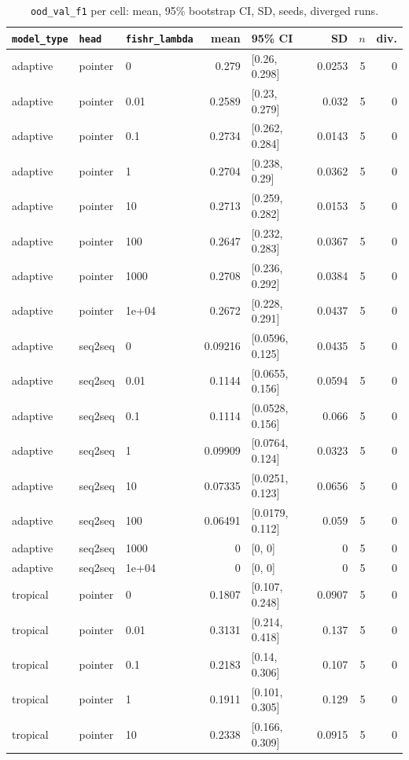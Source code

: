\documentclass[10pt]{article}
\begin{document}
{\small
\begin{longtable}{lllrlrrr}
\caption{\texttt{ood\_val\_f1} per cell: mean, 95\% bootstrap CI, SD, seeds, diverged runs.}\label{tab:summary-ood_val_f1}\\
\toprule
\texttt{model\_type} & \texttt{head} & \texttt{fishr\_lambda} & mean & 95\% CI & SD & $n$ & div.\\
\midrule
\endhead
adaptive & pointer & 0 & 0.279 & [0.26, 0.298] & 0.0253 & 5 & 0\\
adaptive & pointer & 0.01 & 0.2589 & [0.23, 0.279] & 0.032 & 5 & 0\\
adaptive & pointer & 0.1 & 0.2734 & [0.262, 0.284] & 0.0143 & 5 & 0\\
adaptive & pointer & 1 & 0.2704 & [0.238, 0.29] & 0.0362 & 5 & 0\\
adaptive & pointer & 10 & 0.2713 & [0.259, 0.282] & 0.0153 & 5 & 0\\
adaptive & pointer & 100 & 0.2647 & [0.232, 0.283] & 0.0367 & 5 & 0\\
adaptive & pointer & 1000 & 0.2708 & [0.236, 0.292] & 0.0384 & 5 & 0\\
adaptive & pointer & 1e+04 & 0.2672 & [0.228, 0.291] & 0.0437 & 5 & 0\\
adaptive & seq2seq & 0 & 0.09216 & [0.0596, 0.125] & 0.0435 & 5 & 0\\
adaptive & seq2seq & 0.01 & 0.1144 & [0.0655, 0.156] & 0.0594 & 5 & 0\\
adaptive & seq2seq & 0.1 & 0.1114 & [0.0528, 0.156] & 0.066 & 5 & 0\\
adaptive & seq2seq & 1 & 0.09909 & [0.0764, 0.124] & 0.0323 & 5 & 0\\
adaptive & seq2seq & 10 & 0.07335 & [0.0251, 0.123] & 0.0656 & 5 & 0\\
adaptive & seq2seq & 100 & 0.06491 & [0.0179, 0.112] & 0.059 & 5 & 0\\
adaptive & seq2seq & 1000 & 0 & [0, 0] & 0 & 5 & 0\\
adaptive & seq2seq & 1e+04 & 0 & [0, 0] & 0 & 5 & 0\\
tropical & pointer & 0 & 0.1807 & [0.107, 0.248] & 0.0907 & 5 & 0\\
tropical & pointer & 0.01 & 0.3131 & [0.214, 0.418] & 0.137 & 5 & 0\\
tropical & pointer & 0.1 & 0.2183 & [0.14, 0.306] & 0.107 & 5 & 0\\
tropical & pointer & 1 & 0.1911 & [0.101, 0.305] & 0.129 & 5 & 0\\
tropical & pointer & 10 & 0.2338 & [0.166, 0.309] & 0.0915 & 5 & 0\\

\end{longtable}}
\end{document}
